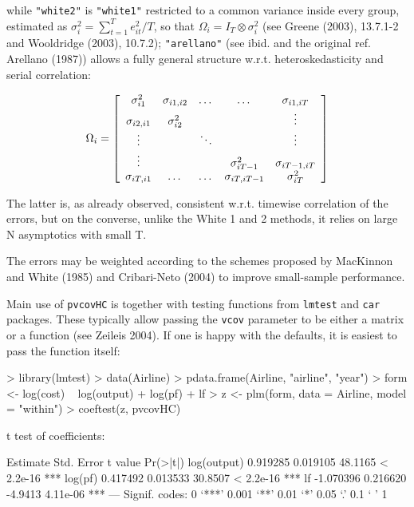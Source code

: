 \documentclass{article}
\begin{document}
while \texttt{"white2"} is \texttt{"white1"} restricted to a common variance inside every group, estimated as $\sigma_i^2=\sum_{t=1}^T{e_{it}^2}/T$, so that $\Omega_i=I_T \otimes \sigma_i^2$ (see Greene (2003), 13.7.1-2 and Wooldridge (2003), 10.7.2); \texttt{"arellano"} (see ibid. and the original ref. Arellano (1987)) allows a fully general structure w.r.t. heteroskedasticity and serial correlation:

\begin{equation}
 \label{eq:omegaArellano}
 \Omega_i=
 \left[ \begin{array}{c c c c c}
 \sigma_{i1}^2 & \sigma_{i1,i2}  & \dots & \dots & \sigma_{i1,iT} \\
 \sigma_{i2,i1} & \sigma_{i2}^2 & & & \vdots \\
 \vdots & & \ddots & & \vdots \\
 \vdots & & & \sigma_{iT-1}^2 & \sigma_{iT-1,iT} \\
 \sigma_{iT,i1} & \dots & \dots & \sigma_{iT,iT-1} & \sigma_{iT}^2 \\
 \end{array} \right]
\end{equation}

The latter is, as already observed, consistent w.r.t. timewise correlation of the errors, but on the converse, unlike the White 1 and 2 methods, it relies on large N asymptotics with small T. 

The errors may be weighted according to the schemes proposed by MacKinnon and White (1985) and Cribari-Neto (2004) to improve small-sample performance. 

Main use of \texttt{pvcovHC} is together with testing functions from \texttt{lmtest} and \texttt{car} packages. These typically allow passing the \texttt{vcov} parameter to be either a matrix or a function (see Zeileis 2004). If one is happy with the defaults, it is easiest to pass the function itself:

\begin{Schunk}
\begin{Sinput}
> library(lmtest)
> data(Airline)
> pdata.frame(Airline, "airline", "year")
> form <- log(cost) ~ log(output) + log(pf) + lf
> z <- plm(form, data = Airline, model = "within")
> coeftest(z, pvcovHC)
\end{Sinput}
\begin{Soutput}
t test of coefficients:

             Estimate Std. Error t value  Pr(>|t|)    
log(output)  0.919285   0.019105 48.1165 < 2.2e-16 ***
log(pf)      0.417492   0.013533 30.8507 < 2.2e-16 ***
lf          -1.070396   0.216620 -4.9413  4.11e-06 ***
---
Signif. codes:  0 ‘***’ 0.001 ‘**’ 0.01 ‘*’ 0.05 ‘.’ 0.1 ‘ ’ 1 
\end{Soutput}
\end{Schunk}
\end{document}
